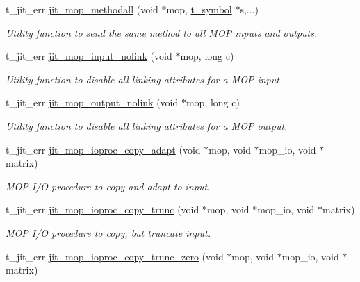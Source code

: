 \begin{DoxyCompactItemize}
t\_\-jit\_\-err \hyperlink{group__mopmod_ga9445dd7ead35149f1349d580c3f54d83}{jit\_\-mop\_\-methodall} (void $\ast$mop, \hyperlink{structt__symbol}{t\_\-symbol} $\ast$s,...)
\begin{DoxyCompactList}\small\item\em Utility function to send the same method to all MOP inputs and outputs. \item\end{DoxyCompactList}\item 
t\_\-jit\_\-err \hyperlink{group__mopmod_ga3f223fa6414f856e2484dbab7508945f}{jit\_\-mop\_\-input\_\-nolink} (void $\ast$mop, long c)
\begin{DoxyCompactList}\small\item\em Utility function to disable all linking attributes for a MOP input. \item\end{DoxyCompactList}\item 
t\_\-jit\_\-err \hyperlink{group__mopmod_ga6878129233c6c88c43b8512db44a43ff}{jit\_\-mop\_\-output\_\-nolink} (void $\ast$mop, long c)
\begin{DoxyCompactList}\small\item\em Utility function to disable all linking attributes for a MOP output. \item\end{DoxyCompactList}\item 
t\_\-jit\_\-err \hyperlink{group__mopmod_ga9d6c3b36f1e4a7ef30d674eda4196a5c}{jit\_\-mop\_\-ioproc\_\-copy\_\-adapt} (void $\ast$mop, void $\ast$mop\_\-io, void $\ast$matrix)
\begin{DoxyCompactList}\small\item\em MOP I/O procedure to copy and adapt to input. \item\end{DoxyCompactList}\item 
t\_\-jit\_\-err \hyperlink{group__mopmod_ga446cc05043fbe3a80baa075ff1b5bebe}{jit\_\-mop\_\-ioproc\_\-copy\_\-trunc} (void $\ast$mop, void $\ast$mop\_\-io, void $\ast$matrix)
\begin{DoxyCompactList}\small\item\em MOP I/O procedure to copy, but truncate input. \item\end{DoxyCompactList}\item 
t\_\-jit\_\-err \hyperlink{group__mopmod_gaa3d27b39f7bb88846553e413ba8d43b9}{jit\_\-mop\_\-ioproc\_\-copy\_\-trunc\_\-zero} (void $\ast$mop, void $\ast$mop\_\-io, void $\ast$matrix)

\end{DoxyCompactItemize}
